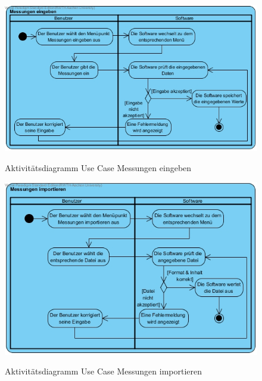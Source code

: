 \begin{figure}[H]
	\centering
	\includegraphics[scale=.5]{Bilder/Messungen_eingeben.jpg}\\
	\caption{Aktivitätsdiagramm Use Case Messungen eingeben}
	\label{Aktivitätsdiagramm Use Case Messungen eingeben}
\end{figure}

\begin{figure}[H]
	\centering
	\includegraphics[scale=.5]{Bilder/Messungen_importieren.jpg}\\
	\caption{Aktivitätsdiagramm Use Case Messungen importieren}
	\label{Aktivitätsdiagramm Use Case Messungen importieren}
\end{figure}

